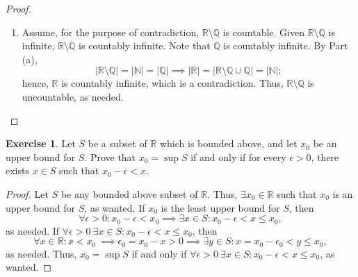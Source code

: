 \documentclass[12pt]{article}
\theoremstyle{definition}
\newtheorem{exercise}{Exercise}
\begin{document}
\begin{proof}
\begin{enumerate}[label=(\alph*)]
\begin{align*}
            &\implies h(x) = 2f(x) - 1 = n \implies n \in h(A \cup B)
        \end{align*}
        xor
        \begin{align*}
            n \in \{2m : m \in \mathbb{N}\} &\implies \exists y \in B : g(y) = \frac{n}{2} \in \mathbb{N} \ (\text{because $g$ is surjective}) \\
            &\implies h(y) = 2g(y) = n \implies n \in h(A \cup B);
        \end{align*}
        hence, $n \in h(A \cup B)$, as needed. Thus, $h : A \cup B \to \mathbb{N}$ is bijective; hence, $A \cup B$ is countably infinite, as needed.
        \item Assume, for the purpose of contradiction, $\mathbb{R} \setminus \mathbb{Q}$ is countable. Given $\mathbb{R} \setminus \mathbb{Q}$ is infinite, $\mathbb{R} \setminus \mathbb{Q}$ is countably infinite. Note that $\mathbb{Q}$ is countably infinite. By Part (a),
        \[
            \vert \mathbb{R} \setminus \mathbb{Q} \vert = \vert \mathbb{N} \vert = \vert \mathbb{Q} \vert \implies \vert \mathbb{R} \vert = \vert \mathbb{R} \setminus \mathbb{Q} \cup \mathbb{Q} \vert = \vert \mathbb{N} \vert;  
        \]
        hence, $\mathbb{R}$ is countably infinite, which is a contradiction. Thus, $\mathbb{R} \setminus \mathbb{Q}$ is uncountable, as needed. 
    \end{enumerate}
\end{proof}

\begin{exercise}
    Let $S$ be a subset of $\mathbb{R}$ which is bounded above, and let $x_0$ be an upper bound for $S$. Prove that $x_0 = \sup S$ if and only if for every $\epsilon > 0$, there exists $x \in S$ such that $x_0 - \epsilon < x $.
\end{exercise}

\begin{proof}
    Let $S$ be any bounded above subset of $\mathbb{R}$. Thus, $\exists x_0 \in \mathbb{R}$ such that $x_0$ is an upper bound for $S$, as wanted. If $x_0$ is the least upper bound for $S$, then
    \[
        \forall \epsilon > 0: x_0 - \epsilon < x_0 \implies \exists x \in S : x_0 - \epsilon < x \leq x_0,
    \]
    as needed. If $\forall \epsilon > 0 \ \exists x \in S : x_0 - \epsilon < x \leq x_0$, then
    \[
        \forall x \in \mathbb{R} : x < x_0 \ \implies \epsilon_0 = x_0 - x > 0 \implies \exists y \in S : x = x_0 - \epsilon_0 < y \leq x_0,
    \]
    as needed. Thus, $x_0 = \sup S$ if and only if $\forall \epsilon > 0 \ \exists x \in S : x_0 - \epsilon < x \leq x_0$, as wanted.
\end{proof}
\end{document}
